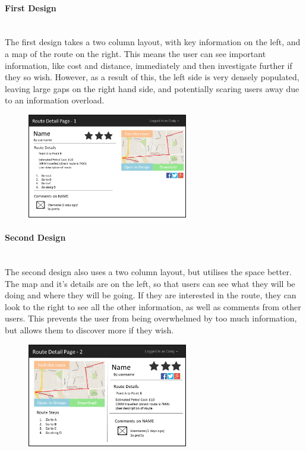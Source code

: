 \documentclass[a4paper,twoside,notitlepage,11pt]{article}
\begin{document}
\paragraph{First Design}\ \\
The first design takes a two column layout, with key information on the left, and a map of the route on the right. This means the user can see important information, like cost and distance, immediately and then investigate further if they so wish. However, as a result of this, the left side is very densely populated, leaving large gaps on the right hand side, and potentially scaring users away due to an information overload.
\begin{figure}[!ht]
	\begin{center}
		\includegraphics[width=0.625\textwidth]{images/ui-detail-1.png}
	\end{center}
	\vspace{-6mm}
\end{figure}

\paragraph{Second Design}\ \\
The second design also uses a two column layout, but utilises the space better. The map and it's details are on the left, so that users can see what they will be doing and where they will be going. If they are interested in the route, they can look to the right to see all the other information, as well as comments from other users. This prevents the user from being overwhelmed by too much information, but allows them to discover more if they wish.
\begin{figure}[!ht]
	\begin{center}
		\includegraphics[width=0.625\textwidth]{images/ui-detail-2.png}
	\end{center}
	\vspace{-12mm}
\end{figure}
\end{document}
